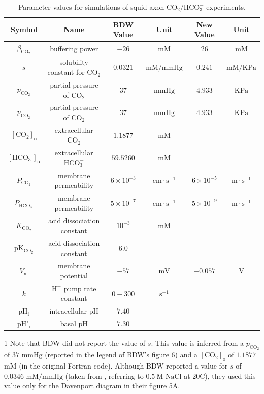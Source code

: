 \documentclass[fleqn,10pt]{physiome}
\begin{document}
\begin{table}[hbt!]
\caption{Parameter values for simulations of squid-axon $\mathrm{CO_2}/\mathrm{HCO_3^-}$ experiments.}\label{table2}
\begin{threeparttable}
\def\arraystretch{1.5}
\begin{tabular}{c|c|c|c|c|c}
\toprule
Symbol & Name & BDW Value & Unit & New Value & Unit \\ 
\midrule
$\beta_\mathrm{CO_2}$ & buffering power & $-26$ & $\mathrm{mM}$ & $26$ & $\mathrm{mM}$ \\ 
$s$ & solubility constant for $\mathrm{CO_2}$ & $0.0321$ \tnote{1} & $\mathrm{mM}/\mathrm{mmHg}$ & $0.241$ & $\mathrm{mM}/\mathrm{KPa}$ \\ 
$p_\mathrm{CO_2}$ & partial pressure of $\mathrm{CO_2}$ & $37$ & $\mathrm{mmHg}$ & $4.933$ & $\mathrm{KPa}$ \\ 
$p_\mathrm{CO_2}$ & partial pressure of $\mathrm{CO_2}$ & $37$ & $\mathrm{mmHg}$ & $4.933$ & $\mathrm{KPa}$ \\ 
${\mathrm{[CO_2]_o}}$ & extracellular $\mathrm{CO_2}$ & $1.1877$ & $\mathrm{mM}$ & & \\ 
${\mathrm{[HCO_3^-]_o}}$ & extracellular $\mathrm{HCO_3^-}$ & $59.5260$ & $\mathrm{mM}$ & & \\ 
$P_{\mathrm{CO_2}}$ & membrane permeability & $6\times 10^{-3}$ & $\mathrm{cm\cdot s^{-1}}$ & $6\times 10^{-5}$ & $\mathrm{m\cdot s^{-1}}$ \\ 
$P_{\mathrm{HCO_3^-}}$ & membrane permeability & $5\times 10^{-7}$ & $\mathrm{cm\cdot s^{-1}}$ & $5\times 10^{-9}$ & $\mathrm{m\cdot s^{-1}}$ \\
$K_\mathrm{CO_2}$ & acid dissociation constant & $10^{-3}$ & $\mathrm{mM}$ & & \\
$\mathrm{pK_{CO_2}}$ & acid dissociation constant & $6.0$ & & & \\
$V_\mathrm{m}$ & membrane potential & $-57$ \tnote{2} & $\mathrm{mV}$ & $-0.057$ & $\mathrm{V}$ \\
$k$ & $\mathrm{H^+}$ pump rate constant & $0-300$ \tnote{3} & $\mathrm{s^{-1}}$ & & \\
$\mathrm{pH_i}$ & intracellular $\mathrm{pH}$ & $7.40$ & & & \\
$\mathrm{{pH}'_i}$ & basal $\mathrm{pH}$ & $7.30$ \tnote{4} & & & \\ 
\bottomrule
\end{tabular}
\begin{tablenotes}
\item[1] Note that BDW did not report the value of $s$. This value is inferred from a $p_\mathrm{CO_2}$ of $37$ $\mathrm{mmHg}$ (reported in the legend of BDW's figure 6) and a $\mathrm{[CO_2]_o}$ of $1.1877$ $\mathrm{mM}$ (in the original Fortran code). Although BDW reported a value for $s$ of $0.0346$ $\mathrm{mM}/\mathrm{mmHg}$ (taken from \cite{harned1943ionization}, referring to $0.5~\mathrm{M}$ $\mathrm{NaCl}$ at $20$\textdegree $\mathrm{C}$), they used this value only for the Davenport diagram in their figure 5A.

\end{tablenotes}
\end{threeparttable}
\end{table}
\end{document}
